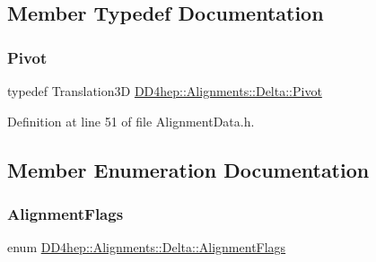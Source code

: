 \subsection{Member Typedef Documentation}
\hypertarget{class_d_d4hep_1_1_alignments_1_1_delta_a9ff8cc825f916a4ae84f1780c11f2519}{}\label{class_d_d4hep_1_1_alignments_1_1_delta_a9ff8cc825f916a4ae84f1780c11f2519} 
\subsubsection{\texorpdfstring{Pivot}{Pivot}}
{\footnotesize\ttfamily typedef Translation3D \hyperlink{class_d_d4hep_1_1_alignments_1_1_delta_a9ff8cc825f916a4ae84f1780c11f2519}{D\+D4hep\+::\+Alignments\+::\+Delta\+::\+Pivot}}



Definition at line 51 of file Alignment\+Data.\+h.



\subsection{Member Enumeration Documentation}
\hypertarget{class_d_d4hep_1_1_alignments_1_1_delta_ab10dd6760463baa51d8b585aaa4c70aa}{}\label{class_d_d4hep_1_1_alignments_1_1_delta_ab10dd6760463baa51d8b585aaa4c70aa} 
\subsubsection{\texorpdfstring{Alignment\+Flags}{AlignmentFlags}}
{\footnotesize\ttfamily enum \hyperlink{class_d_d4hep_1_1_alignments_1_1_delta_ab10dd6760463baa51d8b585aaa4c70aa}{D\+D4hep\+::\+Alignments\+::\+Delta\+::\+Alignment\+Flags}}

